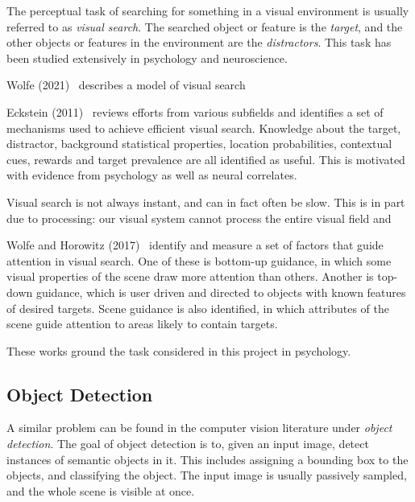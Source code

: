 The perceptual task of searching for something in a visual environment is usually referred to as \textit{visual search}.
The searched object or feature is the \textit{target}, and the other objects or features in the environment are the \textit{distractors}.
This task has been studied extensively in psychology and neuroscience.

Wolfe (2021)~\cite{wolfe_guided_2021} describes a model of visual search


Eckstein (2011)~\cite{eckstein_visual_2011} reviews efforts from various subfields and identifies a set of mechanisms used to achieve efficient visual search.
Knowledge about the target, distractor, background statistical properties, location probabilities, contextual cues, rewards and target prevalence are all identified as useful.
This is motivated with evidence from psychology as well as neural correlates.

Visual search is not always instant, and can in fact often be slow.
This is in part due to processing: our visual system cannot process the entire visual field and 


Wolfe and Horowitz (2017)~\cite{wolfe_horowitz_2017} identify and measure a set of factors that guide attention in visual search.
One of these is bottom-up guidance, in which some visual properties of the scene draw more attention than others.
Another is top-down guidance, which is user driven and directed to objects with known features of desired targets.
Scene guidance is also identified, in which attributes of the scene guide attention to areas likely to contain targets. 

These works ground the task considered in this project in psychology.


\subsection{Object Detection}


A similar problem can be found in the computer vision literature under \textit{object detection}.
The goal of object detection is to, given an input image, detect instances of semantic objects in it.
This includes assigning a bounding box to the objects, and classifying the object.
The input image is usually passively sampled, and the whole scene is visible at once.

